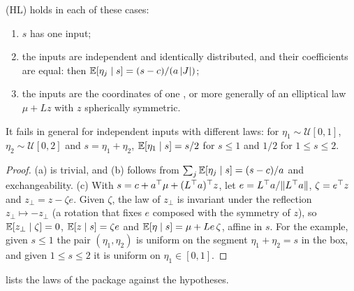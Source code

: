 \documentclass[11pt,a4paper]{article}
\numberwithin{equation}{section}
\newcommand{\Hyp}[1]{\textup{(H#1)}}    %
\begin{document}
\begin{proposition}[Laws with \Hyp{L}]
\label{prop:hyp-L}
\Hyp{L} holds in each of these cases:
\begin{enumerate}[label=(\alph*),nosep]
\item $s$ has one input;
\item the inputs are independent and identically distributed, and their coefficients are equal: then $\mathbb{E}[\eta_j \mid s] = (s - c)/(a\,\lvert J \rvert)$;
\item the inputs are the coordinates of one , or more generally of an elliptical law $\mu + Lz$ with $z$ spherically symmetric.
\end{enumerate}
It fails in general for independent inputs with different laws:
for $\eta_1 \sim \mathcal{U}[0, 1]$, $\eta_2 \sim \mathcal{U}[0, 2]$ and $s = \eta_1 + \eta_2$, $\mathbb{E}[\eta_1 \mid s] = s/2$ for $s \le 1$ and $1/2$ for $1 \le s \le 2$.
\end{proposition}

\begin{proof}
(a) is trivial, and (b) follows from $\sum_j \mathbb{E}[\eta_j \mid s] = (s - c)/a$ and exchangeability.
(c) With $s = c + a^\top\mu + (L^\top a)^\top z$, let $e = L^\top a/\lVert L^\top a \rVert$, $\zeta = e^\top z$ and $z_\perp = z - \zeta e$.
Given $\zeta$, the law of $z_\perp$ is invariant under the reflection $z_\perp \mapsto -z_\perp$ (a rotation that fixes $e$ composed with the symmetry of $z$),
so $\mathbb{E}[z_\perp \mid \zeta] = 0$, $\mathbb{E}[z \mid s] = \zeta e$ and $\mathbb{E}[\eta \mid s] = \mu + Le\,\zeta$, affine in $s$.
For the example, given $s \le 1$ the pair $(\eta_1, \eta_2)$ is uniform on the segment $\eta_1 + \eta_2 = s$ in the box, and given $1 \le s \le 2$ it is uniform on $\eta_1 \in [0, 1]$.
\end{proof}

 lists the laws of the package against the hypotheses.
\end{document}
